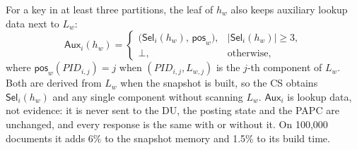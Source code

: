 


For a key in at least three partitions, the leaf of $h_w$ also keeps auxiliary lookup data
next to $L_w$:
\begin{equation}
\mathsf{Aux}_i(h_w) =
\begin{cases}
\big(\mathsf{Sel}_i(h_w),\, \mathsf{pos}_w\big), & |\mathsf{Sel}_i(h_w)| \ge 3,\\
\bot, & \text{otherwise},
\end{cases}
\label{eq:part-leaf}
\end{equation}
where $\mathsf{pos}_w(PID_{i,j}) = j$ when $(PID_{i,j}, L_{w,j})$ is the $j$-th component of
$L_w$. Both are derived from $L_w$ when the snapshot is built, so the CS obtains
$\mathsf{Sel}_i(h_w)$ and any single component without scanning $L_w$. $\mathsf{Aux}_i$ is
lookup data, not evidence: it is never sent to the DU, the posting state and the PAPC are
unchanged, and every response is the same with or without it. On 100{,}000 documents it adds
6\% to the snapshot memory and 1.5\% to its build time.

